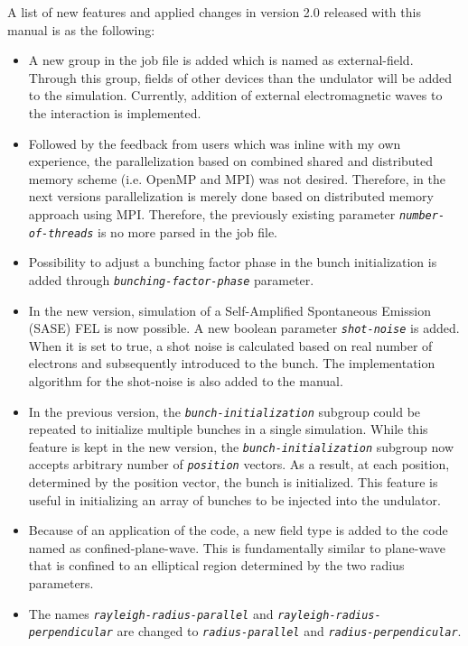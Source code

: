 A list of new features and applied changes in version 2.0 released with this manual is as the following:
%
\begin{itemize}
	\setlength{\parskip}{0pt}
	\setlength{\itemsep}{0pt plus 1pt}
	\item A new group in the job file is added which is named as external-field. Through this group, fields of other devices than the undulator will be added to the simulation. Currently, addition of external electromagnetic waves to the interaction is implemented.
	\item Followed by the feedback from users which was inline with my own experience, the parallelization based on combined shared and distributed memory scheme (i.e. OpenMP and MPI) was not desired. Therefore, in the next versions parallelization is merely done based on distributed memory approach using MPI. Therefore, the previously existing parameter {\tt \em \small number-of-threads} is no more parsed in the job file.
	\item Possibility to adjust a bunching factor phase in the bunch initialization is added through {\tt \small \em bunching-factor-phase} parameter.
	\item In the new version, simulation of a Self-Amplified Spontaneous Emission (SASE) FEL is now possible. A new boolean parameter {\tt \small \em shot-noise} is added. When it is set to true, a shot noise is calculated based on real number of electrons and subsequently introduced to the bunch. The implementation algorithm for the shot-noise is also added to the manual.
	\item In the previous version, the {\tt \small \em bunch-initialization} subgroup could be repeated to initialize multiple bunches in a single simulation. While this feature is kept in the new version, the {\tt \small \em bunch-initialization} subgroup now accepts arbitrary number of {\tt \small \em position} vectors. As a result, at each position, determined by the position vector, the bunch is initialized. This feature is useful in initializing an array of bunches to be injected into the undulator.
	\item Because of an application of the code, a new field type is added to the code named as confined-plane-wave. This is fundamentally similar to plane-wave that is confined to an elliptical region determined by the two radius parameters.
	\item The names {\tt \em \small rayleigh-radius-parallel} and {\tt \em \small rayleigh-radius-perpendicular} are changed to {\tt \em \small radius-parallel} and {\tt \em \small radius-perpendicular}.

\end{itemize}
